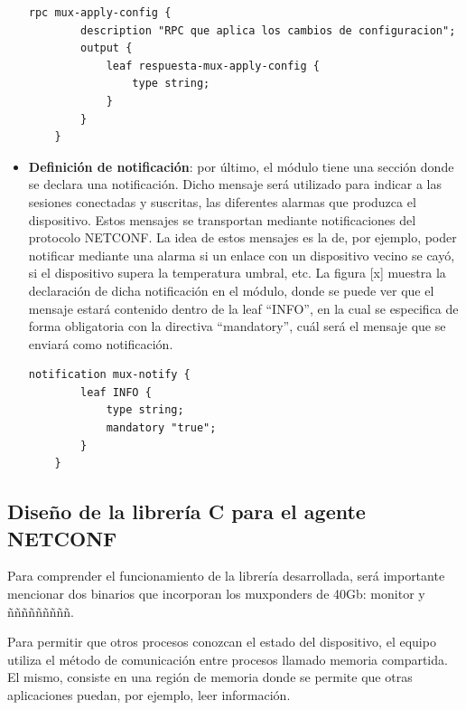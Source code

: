 \begin{itemize}
    \begin{lstlisting}[language=SHELXL, caption=Interacción tipica con un dispositivo mediante \textit{CLI}., label=lstlisting:cli]
    rpc mux-apply-config {        
        description "RPC que aplica los cambios de configuracion";
        output {
            leaf respuesta-mux-apply-config {
                type string;
            }
        }
    }
    \end{lstlisting}

    \item \textbf{Definición de notificación}: por último, el módulo tiene una sección donde se declara una notificación. Dicho mensaje será utilizado para indicar a las sesiones conectadas y suscritas, las diferentes alarmas que produzca el dispositivo. Estos mensajes se transportan mediante notificaciones del protocolo NETCONF.  La idea de estos mensajes es la de, por ejemplo, poder notificar mediante una alarma si un enlace con un dispositivo vecino se cayó, si el dispositivo supera la temperatura umbral, etc. La figura [x] muestra la declaración de dicha notificación en el módulo, donde se puede ver que el mensaje estará contenido dentro de la leaf “INFO”, en la cual se especifica de forma obligatoria con la directiva “mandatory”, cuál será el mensaje que se enviará como notificación.


    \begin{lstlisting}[language=SHELXL, caption=Interacción tipica con un dispositivo mediante \textit{CLI}., label=lstlisting:cli]
    notification mux-notify {
        leaf INFO {
            type string;
            mandatory "true";
        }
    }
    \end{lstlisting}

\end{itemize}

\subsection{Diseño de la librería C para el agente NETCONF}
Para comprender el funcionamiento de la librería desarrollada, será importante mencionar dos binarios que incorporan los muxponders de 40Gb: monitor y ñññññññññ. 

Para permitir que otros procesos conozcan el estado del dispositivo, el equipo utiliza el método de comunicación entre procesos llamado memoria compartida. El mismo, consiste en una región de memoria donde se permite que otras aplicaciones puedan, por ejemplo, leer información. 

